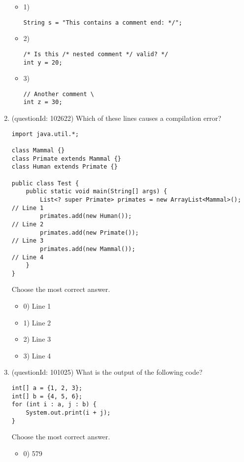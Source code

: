 \documentclass[12pt]{article}
\begin{document}
\begin{enumerate}[label=(\arabic*)]
\begin{itemize}
\item 1) \begin{verbatim}
String s = "This contains a comment end: */";
\end{verbatim}

\item 2) \begin{verbatim}
/* Is this /* nested comment */ valid? */
int y = 20;
\end{verbatim}

\item 3) \begin{verbatim}
// Another comment \
int z = 30;
\end{verbatim}

\end{itemize}
\item (questionId: 102622) Which of these lines causes a compilation error?\begin{verbatim}
import java.util.*;

class Mammal {}
class Primate extends Mammal {}
class Human extends Primate {}

public class Test {
    public static void main(String[] args) {
        List<? super Primate> primates = new ArrayList<Mammal>(); // Line 1
        primates.add(new Human());                                // Line 2
        primates.add(new Primate());                              // Line 3
        primates.add(new Mammal());                               // Line 4
    }
}
\end{verbatim}
Choose the most correct answer. 
\begin{itemize}
\item 0) Line 1

\item 1) Line 2

\item 2) Line 3

\item 3) Line 4

\end{itemize}
\item (questionId: 101025) What is the output of the following code?\n\begin{verbatim}
int[] a = {1, 2, 3};
int[] b = {4, 5, 6};
for (int i : a, j : b) {
    System.out.print(i + j);
}
\end{verbatim}
Choose the most correct answer. 
\begin{itemize}
\item 0) 579


\end{itemize}
\end{enumerate}
\end{document}
